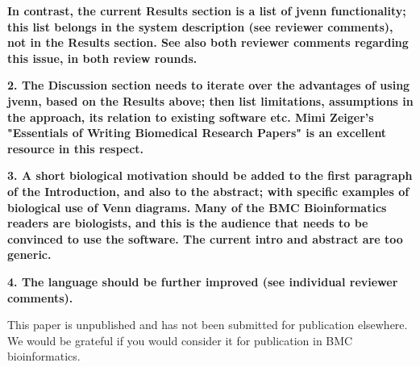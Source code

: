 \documentclass[10pt,stdletter,dateno,sigleft]{newlfm} %
\begin{document}
\begin{newlfm}
\textbf{In contrast, the current Results section is a list of jvenn
functionality; this list belongs in the system description (see reviewer
comments), not in the Results section. See also both reviewer comments regarding
this issue, in both review rounds.}

\textbf{2. The Discussion section needs to iterate over the advantages of using
jvenn, based on the Results above; then list limitations, assumptions in the
approach, its relation to existing software etc. Mimi Zeiger's "Essentials of
Writing Biomedical Research Papers" is an excellent resource in this respect.}

\textbf{3. A short biological motivation should be added to the first paragraph
of the Introduction, and also to the abstract; with specific examples of
biological use of Venn diagrams. Many of the BMC Bioinformatics readers are
biologists, and this is the audience that needs to be convinced to use the
software. The current intro and abstract are too generic.}

\textbf{4. The language should be further improved (see individual reviewer
comments).}


This paper is unpublished and has not been submitted for publication elsewhere. 
We would be grateful if you would consider it for publication in BMC 
bioinformatics.


\end{newlfm}
\end{document}

